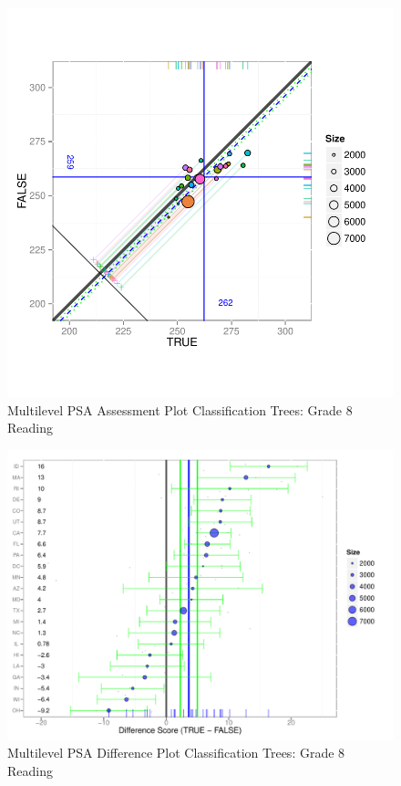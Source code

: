 \documentclass[letterpaper,12p,twoside]{article} %
\begin{document}
\begin{figure}[h!]
\begin{center}
\includegraphics[width=\textwidth]{../Figures2009/g8read-mlpsa-ctree-circ.pdf}
\caption{Multilevel PSA Assessment Plot Classification Trees: Grade 8 Reading}
\end{center}
\end{figure}

\begin{figure}[h!]
\begin{center}
\includegraphics[width=\textwidth]{../Figures2009/g8read-mlpsa-ctree-diff.pdf}
\caption{Multilevel PSA Difference Plot Classification Trees: Grade 8 Reading}
\end{center}
\end{figure}
\end{document}
